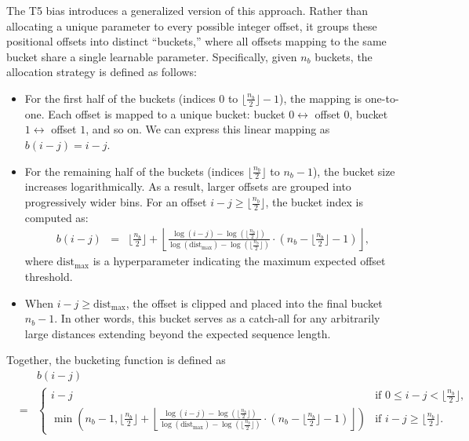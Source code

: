 The T5 bias introduces a generalized version of this approach. Rather than allocating a unique parameter to every possible integer offset, it groups these positional offsets into distinct ``buckets,'' where all offsets mapping to the same bucket share a single learnable parameter. Specifically, given $n_b$ buckets, the allocation strategy is defined as follows:

\begin{itemize}
\item \vspace{0.5em} For the first half of the buckets (indices $0$ to $\lfloor \frac{n_b}{2} \rfloor - 1$), the mapping is one-to-one. Each offset is mapped to a unique bucket: bucket $0 \leftrightarrow$ offset $0$, bucket $1 \leftrightarrow$ offset $1$, and so on. We can express this linear mapping as $b(i - j) = i - j$.
\item \vspace{0.3em} For the remaining half of the buckets (indices $\lfloor \frac{n_b}{2} \rfloor$ to $n_b - 1$), the bucket size increases logarithmically. As a result, larger offsets are grouped into progressively wider bins. For an offset $i - j \ge \lfloor \frac{n_b}{2} \rfloor$, the bucket index is computed as:
    \begin{eqnarray}
    b(i - j) & = & \lfloor \frac{n_b}{2} \rfloor + \left\lfloor \frac{\log(i - j) - \log(\lfloor \frac{n_b}{2} \rfloor)}{\log(\mathrm{dist}_{\mathrm{max}}) - \log(\lfloor \frac{n_b}{2} \rfloor)} \cdot \left(n_b - \lfloor \frac{n_b}{2} \rfloor - 1\right) \right\rfloor,
    \end{eqnarray}
    \noindent where $\mathrm{dist}_{\mathrm{max}}$ is a hyperparameter indicating the maximum expected offset threshold.
\item \vspace{0.3em} When $i - j \ge \mathrm{dist}_{\mathrm{max}}$, the offset is clipped and placed into the final bucket $n_b - 1$. In other words, this bucket serves as a catch-all for any arbitrarily large distances extending beyond the expected sequence length.
\end{itemize}

Together, the bucketing function is defined as
{\small
\begin{eqnarray}
& & b(i - j) \nonumber \\
& = &
\begin{cases}
i - j & \text{if } 0 \le i - j < \lfloor \frac{n_b}{2} \rfloor, \\
\min\left(n_b - 1, \lfloor \frac{n_b}{2} \rfloor + \left\lfloor \frac{\log(i - j) - \log(\lfloor \frac{n_b}{2} \rfloor)}{\log(\mathrm{dist}_{\mathrm{max}}) - \log(\lfloor \frac{n_b}{2} \rfloor)} \cdot \left(n_b - \lfloor \frac{n_b}{2} \rfloor - 1\right) \right\rfloor \right) & \text{if } i - j \ge \lfloor \frac{n_b}{2} \rfloor.
\end{cases} \nonumber \\
\end{eqnarray}
}


